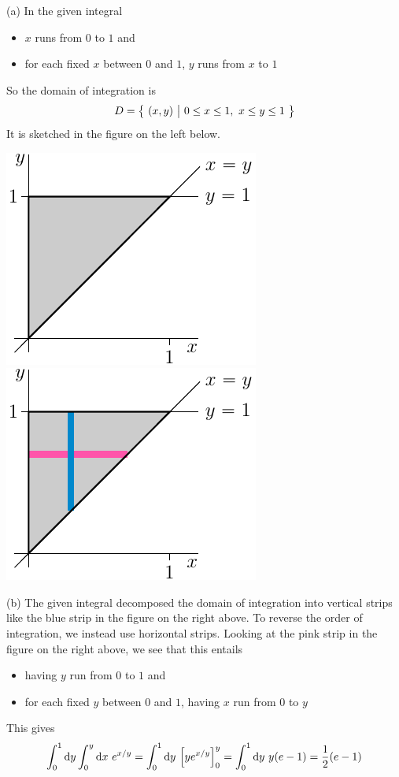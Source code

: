\begin{solution}
(a) In the given integral
\begin{itemize}
\item 
  $x$ runs from $0$ to $1$ and
\item
  for each fixed $x$ between $0$ and $1$, $y$ runs from $x$ to $1$ 
\end{itemize}
So the domain of integration is 
\begin{equation*}
D = \big\{ \ (x,y)\ \big|\ 0\le x\le 1,\ x\le y\le 1\ \big\}
\end{equation*}
It is sketched in the figure on the left below.

\begin{center}
     \includegraphics{fig/OE04Q7a.pdf}\qquad
     \includegraphics{fig/OE04Q7.pdf}
\end{center}


(b) The given integral decomposed the domain of integration into 
vertical strips like the blue strip in the figure on the right above. 
To reverse the order of integration, we instead use horizontal strips. 
Looking at the pink strip in the figure on the right above, we see that 
this entails
\begin{itemize}
\item 
  having $y$ run from $0$ to $1$ and
\item
  for each fixed $y$ between $0$ and $1$, having $x$ run from $0$ to $y$ 
\end{itemize}
This gives
\begin{equation*}
\int_0^1\mathrm{d}y\int_0^y \mathrm{d}x\ e^{x/y}=\int_0^1\mathrm{d}y\ \Big[ye^{x/y}\Big]_0^y
=\int_0^1\mathrm{d}y\ y(e-1)
=\frac{1}{2} (e-1)
\end{equation*}
\end{solution}

